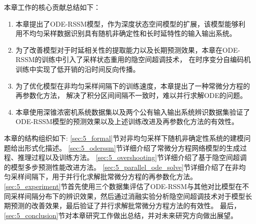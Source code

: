 本章工作的核心贡献总结如下：
\begin{enumerate}
\item 本章提出了ODE-RSSM模型，作为深度状态空间模型的扩展，该模型能够利用不均匀采样数据识别具有随机非确定性和长时延特性的输入输出系统。
\item 为了改善模型对于时延相关性的提取能力以及长期预测效果，本章在ODE-RSSM的训练中引入了采样状态重用的隐空间超调技术，
在时序变分自编码机训练中实现了低开销的沿时间反向传播。
\item 为了优化模型在非均匀采样间隔下的训练速度，本章提出了一种常微分方程的再参数化方法，
解决了积分区间间隔不一致时，难以并行求解ODE的问题。
\item 本章使用深锥浓密机系统数据集以及两个公有输入输出系统辨识数据集验证了ODE-RSSM模型的预测效果以及上述训练改进及再参数化方法的有效性。
\end{enumerate}

本章的结构组织如下:
\ref{sec:5_formal}节对非均匀采样下随机非确定性系统的建模问题给出形式化描述。
\ref{sec:5_oderssm}节详细介绍了常微分方程网络模型的生成过程、推理过程以及训练方法。
\ref{sec:5_overshooting}节详细介绍了基于隐空间超调的模型多步预测性能改进方法。
\ref{sec:5_parallel_ode_solve}节详细介绍了在非均匀采样间隔下，用于并行化求解批常微分方程的再参数化方法。
\ref{sec:5_experiment}节首先使用三个数据集评估了ODE-RSSM与其他对比模型在不同采样间隔分布下的辨识效果，然后通过消融实验分析隐空间超调技术对于模型长期预测的改善效果，最后验证了并行求解批常微分方程方法的有效性。
最后，\ref{sec:5_conclusion}节对本章研究工作做出总结，并对未来研究方向做出展望。



